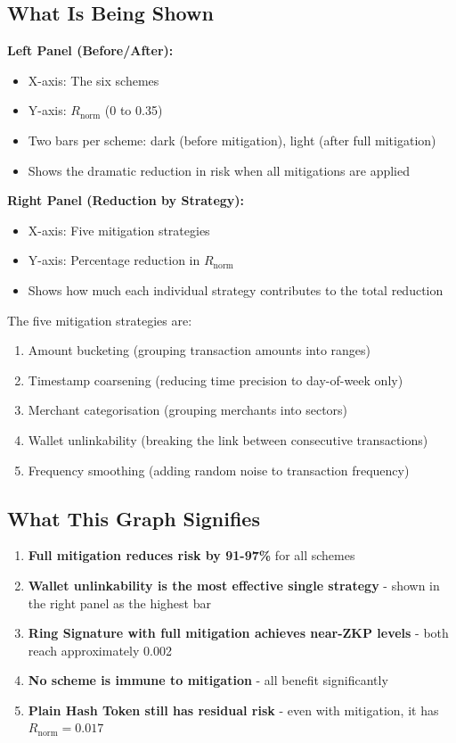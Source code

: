 \documentclass[12pt,a4paper,oneside,openany]{report}
\begin{document}
\subsection{What Is Being Shown}

\textbf{Left Panel (Before/After):}
\begin{itemize}
    \item X-axis: The six schemes
    \item Y-axis: $R_{\mathrm{norm}}$ (0 to 0.35)
    \item Two bars per scheme: dark (before mitigation), light (after full mitigation)
    \item Shows the dramatic reduction in risk when all mitigations are applied
\end{itemize}

\textbf{Right Panel (Reduction by Strategy):}
\begin{itemize}
    \item X-axis: Five mitigation strategies
    \item Y-axis: Percentage reduction in $R_{\mathrm{norm}}$
    \item Shows how much each individual strategy contributes to the total reduction
\end{itemize}

The five mitigation strategies are:
\begin{enumerate}
    \item Amount bucketing (grouping transaction amounts into ranges)
    \item Timestamp coarsening (reducing time precision to day-of-week only)
    \item Merchant categorisation (grouping merchants into sectors)
    \item Wallet unlinkability (breaking the link between consecutive transactions)
    \item Frequency smoothing (adding random noise to transaction frequency)
\end{enumerate}

\subsection{What This Graph Signifies}
\begin{enumerate}
    \item \textbf{Full mitigation reduces risk by 91-97\%} for all schemes
    \item \textbf{Wallet unlinkability is the most effective single strategy} - shown in the right panel as the highest bar
    \item \textbf{Ring Signature with full mitigation achieves near-ZKP levels} - both reach approximately 0.002
    \item \textbf{No scheme is immune to mitigation} - all benefit significantly
    \item \textbf{Plain Hash Token still has residual risk} - even with mitigation, it has $R_{\mathrm{norm}} = 0.017$
\end{enumerate}
\end{document}
